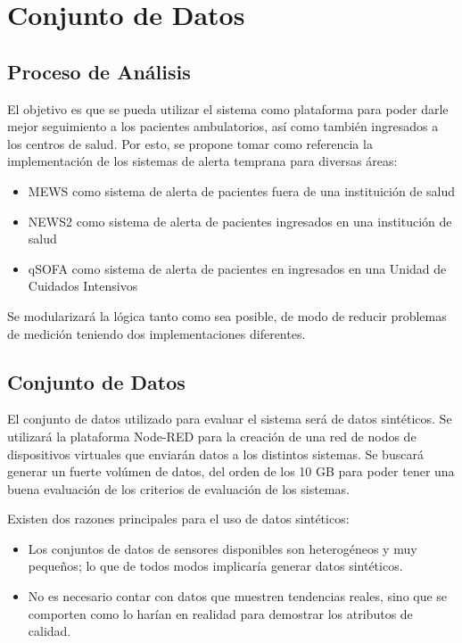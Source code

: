 \section{Conjunto de Datos}

\subsection{Proceso de Análisis}

El objetivo es que se pueda utilizar el sistema como plataforma para poder darle mejor seguimiento a los pacientes ambulatorios,
así como también ingresados a los centros de salud. 
Por esto, se propone tomar como referencia la implementación de los sistemas de alerta temprana para diversas áreas: 

\begin{itemize}
    \item MEWS como sistema de alerta de pacientes fuera de una instituición de salud
    \item NEWS2 como sistema de alerta de pacientes ingresados en una institución de salud
    \item qSOFA como sistema de alerta de pacientes en ingresados en una Unidad de Cuidados Intensivos
\end{itemize}

Se modularizará la lógica tanto como sea posible, de modo de reducir problemas de medición teniendo dos implementaciones diferentes. 

\subsection{Conjunto de Datos}

El conjunto de datos utilizado para evaluar el sistema será de datos sintéticos. 
Se utilizará la plataforma Node-RED para la creación de una red de nodos de dispositivos virtuales que enviarán datos a los distintos sistemas. 
Se buscará generar un fuerte volúmen de datos, del orden de los 10 GB para poder tener una buena evaluación de los criterios de evaluación de los sistemas. 

Existen dos razones principales para el uso de datos sintéticos: 

\begin{itemize}
    \item Los conjuntos de datos de sensores disponibles son heterogéneos y muy pequeños; lo que de todos modos implicaría generar datos sintéticos.
    \item No es necesario contar con datos que muestren tendencias reales, sino que se comporten como lo harían en realidad para demostrar los atributos de calidad.
\end{itemize}

